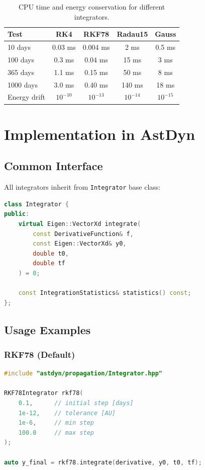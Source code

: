 \begin{table}[htbp]
\centering
\begin{tabular}{lcccc}
\toprule
\textbf{Test} & \textbf{RK4} & \textbf{RKF78} & \textbf{Radau15} & \textbf{Gauss} \\
\midrule
10 days & 0.03 ms & 0.004 ms & 2 ms & 0.5 ms \\
100 days & 0.3 ms & 0.04 ms & 15 ms & 3 ms \\
365 days & 1.1 ms & 0.15 ms & 50 ms & 8 ms \\
1000 days & 3.0 ms & 0.40 ms & 140 ms & 18 ms \\
\midrule
Energy drift & $10^{-10}$ & $10^{-13}$ & $10^{-14}$ & $10^{-15}$ \\
\bottomrule
\end{tabular}
\caption{CPU time and energy conservation for different integrators.}
\label{tab:benchmark_results}
\end{table}

\section{Implementation in AstDyn}

\subsection{Common Interface}

All integrators inherit from \texttt{Integrator} base class:

\begin{lstlisting}[language=C++,caption={Integrator interface}]
class Integrator {
public:
    virtual Eigen::VectorXd integrate(
        const DerivativeFunction& f,
        const Eigen::VectorXd& y0,
        double t0,
        double tf
    ) = 0;
    
    const IntegrationStatistics& statistics() const;
};
\end{lstlisting}

\subsection{Usage Examples}

\subsubsection{RKF78 (Default)}

\begin{lstlisting}[language=C++]
#include "astdyn/propagation/Integrator.hpp"

RKF78Integrator rkf78(
    0.1,      // initial step [days]
    1e-12,    // tolerance [AU]
    1e-6,     // min step
    100.0     // max step
);

auto y_final = rkf78.integrate(derivative, y0, t0, tf);
\end{lstlisting}

